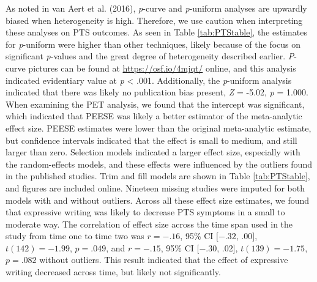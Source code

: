 \documentclass[english,man]{apa6}
\theoremstyle{definition}
\theoremstyle{definition}
\theoremstyle{definition}
\theoremstyle{remark}
\begin{document}
As noted in van Aert et al. (2016), \emph{p}-curve and \emph{p}-uniform
analyses are upwardly biased when heterogeneity is high. Therefore, we
use caution when interpreting these analyses on PTS outcomes. As seen in
Table \ref{tab:PTStable}, the estimates for \emph{p}-uniform were higher
than other techniques, likely because of the focus on significant
\emph{p}-values and the great degree of heterogeneity described earlier.
\emph{P}-curve pictures can be found at \url{https://osf.io/4mjqt/}
online, and this analysis indicated evidentiary value at \emph{p}
\textless{} .001. Additionally, the \emph{p}-uniform analysis indicated
that there was likely no publication bias present, \emph{Z} = -5.02,
\emph{p} = 1.000. When examining the PET analysis, we found that the
intercept was significant, which indicated that PEESE was likely a
better estimator of the meta-analytic effect size. PEESE estimates were
lower than the original meta-analytic estimate, but confidence intervals
indicated that the effect is small to medium, and still larger than
zero. Selection models indicated a larger effect size, especially with
the random-effects models, and these effects were influenced by the
outliers found in the published studies. Trim and fill models are shown
in Table \ref{tab:PTStable}, and figures are included online. Nineteen
missing studies were imputed for both models with and without outliers.
Across all these effect size estimates, we found that expressive writing
was likely to decrease PTS symptoms in a small to moderate way. The
correlation of effect size across the time span used in the study from
time one to time two was \(r = -.16\), 95\% CI \([-.32\), \(.00]\),
\(t(142) = -1.99\), \(p = .049\), and \(r = -.15\), 95\% CI \([-.30\),
\(.02]\), \(t(139) = -1.75\), \(p = .082\) without outliers. This result
indicated that the effect of expressive writing decreased across time,
but likely not significantly.
\end{document}
